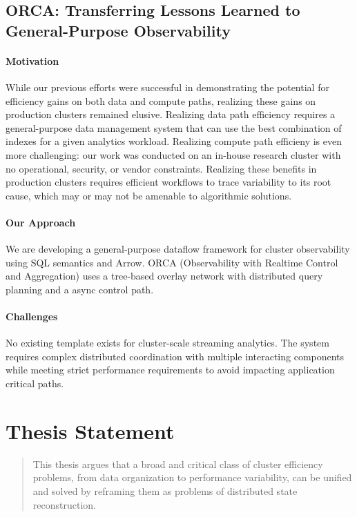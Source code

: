 \subsection{ORCA: Transferring Lessons Learned to General-Purpose Observability}

\paragraph{Motivation}
While our previous efforts were successful in demonstrating the potential for efficiency gains on
both data and compute paths, realizing these gains on production clusters remained elusive.
Realizing data path efficiency requires a general-purpose data management system that can use the
best combination of indexes for a given analytics workload.
Realizing compute path efficieny is even more challenging: our work was conducted on an in-house
research cluster with no operational, security, or vendor constraints.
Realizing these benefits in production clusters requires efficient workflows to trace variability
to its root cause, which may or may not be amenable to algorithmic solutions.

\paragraph{Our Approach}
We are developing a general-purpose dataflow framework for cluster observability using SQL
semantics and Arrow.
ORCA (Observability with Realtime Control and Aggregation) uses a tree-based overlay network with
distributed query planning and a async control path.

\paragraph{Challenges}
No existing template exists for cluster-scale streaming analytics.
The system requires complex distributed coordination with multiple interacting components while
meeting strict performance requirements to avoid impacting application critical paths.

\section{Thesis Statement}

\begin{quote}
  This thesis argues that a broad and critical class of cluster efficiency problems, from data
  organization to performance variability, can be unified and solved by reframing them as problems of
  distributed state reconstruction.
\end{quote}

